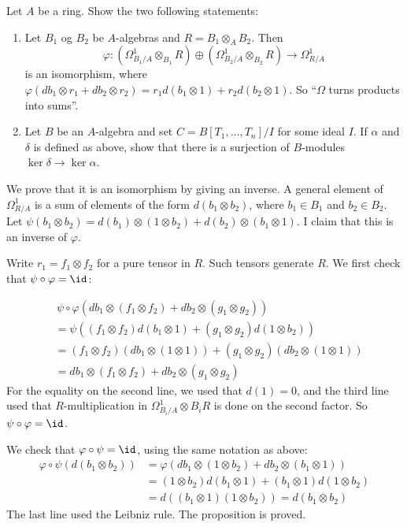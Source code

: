 \documentclass[11pt, english]{article}
\begin{document}
\begin{exc}
Let $A$ be a ring. Show the two following statements:
\begin{enumerate}
\item Let $B_1$ og $B_2$ be $A$-algebras and $R=B_1 \otimes_A B_2$. Then
\[
\varphi:(\Omega_{B_1/A}^1 \otimes_{B_1} R) \oplus (\Omega_{B_2/A}^1 \otimes_{B_2} R) \to \Omega_{R/A}^1
\]
is an isomorphism, where $\varphi(db_1 \otimes r_1 + db_2 \otimes r_2) = r_1 d(b_1 \otimes 1) + r_2d(b_2 \otimes 1)$.  So ``$\Omega$ turns products into sums''.
\item 
Let $B$ be an $A$-algebra and set $C=B[T_1, \dotsc, T_n]/I$ for some ideal $I$. If $\alpha$ and $\delta$ is defined as above, show that there is a surjection of $B$-modules $\ker \delta \to \ker \alpha$.
\end{enumerate}
\end{exc}
\begin{sol}
We prove that it is an isomorphism by giving an inverse. A general element of $\Omega_{R/A}^1$ is a sum of elements of the form $d(b_1 \otimes b_2)$, where $b_1 \in B_1$ and $b_2 \in B_2$. Let $\psi(b_1 \otimes b_2)=d(b_1) \otimes (1 \otimes b_2) + d(b_2) \otimes (b_1 \otimes 1)$. I claim that this is an inverse of $\varphi$.

Write $r_1 = f_1 \otimes f_2$ for a pure tensor in $R$. Such tensors generate $R$. We first check that $\psi \circ \varphi = \id$:

\begin{align*}
&\,  \psi \circ \varphi(db_1 \otimes (f_1 \otimes f_2) + db_2 \otimes (g_1 \otimes g_2) ) \\  &= \psi((f_1 \otimes f_2)d(b_1 \otimes 1)  + (g_1 \otimes g_2)d(1 \otimes b_2)) \\
&= (f_1 \otimes f_2)( db_1 \otimes (1 \otimes 1)) + (g_1 \otimes g_2)(db_2 \otimes (1 \otimes 1)) \\
&= db_1 \otimes (f_1 \otimes f_2) + db_2 \otimes (g_1 \otimes g_2)
\end{align*}
For the equality on the second line, we used that $d(1)=0$, and the third line used that $R$-multiplication in $\Omega_{B_i/A}^1 \otimes B_i R$ is done on the second factor. So $\psi \circ \varphi = \id$.

We check that $\varphi \circ \psi = \id$, using the same notation as above:
\begin{align*}
\varphi \circ \psi(d(b_1 \otimes b_2)) &= \varphi( db_1 \otimes (1 \otimes b_2) + db_2 \otimes (b_1 \otimes 1)) \\
&= (1 \otimes b_2) d(b_1 \otimes 1) + (b_1 \otimes 1) d(1 \otimes b_2) \\
&= d((b_1 \otimes 1)(1 \otimes b_2)) = d(b_1 \otimes b_2)
\end{align*}
The last line used the Leibniz rule. The proposition is proved.
\end{sol}
\end{document}
